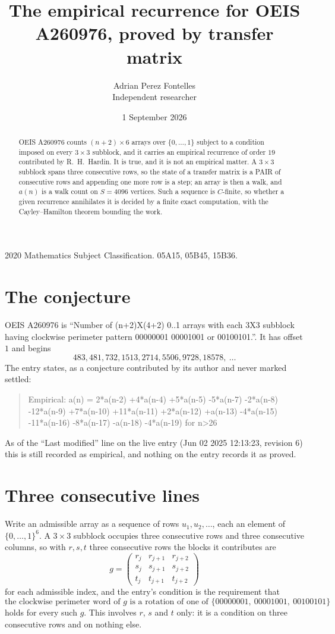 \documentclass[11pt,a4paper]{article}
\title{The empirical recurrence for OEIS A260976, proved by transfer matrix}
\author{Adrian Perez Fontelles\\ \small Independent researcher}
\date{1 September 2026}
\theoremstyle{plain}
\theoremstyle{definition}
\begin{document}
\maketitle

\begin{abstract}
OEIS A260976 counts $(n+2)\times6$ arrays over $\{0,\dots,1\}$ subject to a condition imposed on
every $3\times3$ subblock, and it carries an empirical recurrence of order $19$
contributed by R.~H.~Hardin. It is true, and it is not an empirical matter. A $3\times3$
subblock spans three consecutive rows, so the state of a transfer matrix is a PAIR of
consecutive rows and appending one more row is a step; an array is then a walk, and
$a(n)$ is a walk count on $S=4096$ vertices. Such a sequence is $C$-finite, so whether a given
recurrence annihilates it is decided by a finite exact computation, with the Cayley--Hamilton
theorem bounding the work.
\end{abstract}

\noindent\small 2020 Mathematics Subject Classification. 05A15, 05B45, 15B36.\normalsize

\section{The conjecture}

OEIS A260976 is ``Number of (n+2)X(4+2) 0..1 arrays with each 3X3 subblock having clockwise perimeter pattern 00000001 00001001 or 00100101.''. It has offset $1$ and begins
\[
483, 481, 732, 1513, 2714, 5506, 9728, 18578,\ \dots
\]
The entry states, as a conjecture contributed by its author and never marked settled:
\begin{quote}
Empirical: a(n) = 2*a(n-2) +4*a(n-4) +5*a(n-5) -5*a(n-7) -2*a(n-8) -12*a(n-9) +7*a(n-10) +11*a(n-11) +2*a(n-12) +a(n-13) -4*a(n-15) -11*a(n-16) -8*a(n-17) -a(n-18) -4*a(n-19) for n>26
\end{quote}
As of the ``Last modified'' line on the live entry (Jun 02 2025 12:13:23, revision 6) this is still
recorded as empirical, and nothing on the entry records it as proved.

\section{Three consecutive lines}

Write an admissible array as a sequence of rows $u_1,u_2,\dots$, each an element of
$\{0,\dots,1\}^{6}$. A $3\times3$ subblock occupies three consecutive rows and
three consecutive columns, so with $r,s,t$ three consecutive rows the blocks it
contributes are
\[
g=\begin{pmatrix}r_j&r_{j+1}&r_{j+2}\\ s_j&s_{j+1}&s_{j+2}\\ t_j&t_{j+1}&t_{j+2}\end{pmatrix}
\]
for each admissible index, and the entry's condition is the requirement that
\[
\text{the clockwise perimeter word of }g\text{ is a rotation of one of }\{00000001,\ 00001001,\ 00100101\}
\]
holds for every such $g$. This involves $r$, $s$ and $t$ only: it is a condition on
three consecutive rows and on nothing else.
\end{document}
